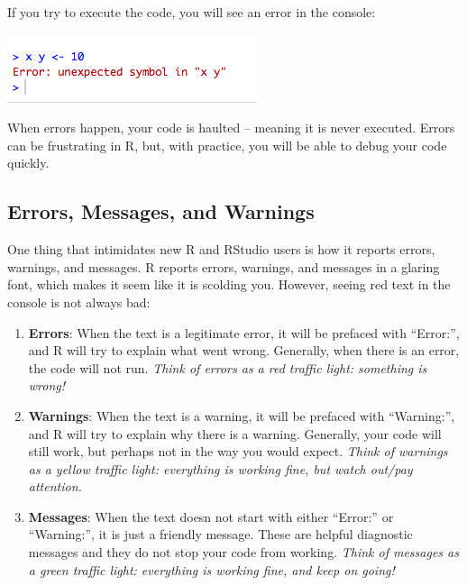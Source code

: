 \documentclass[]{book}
\begin{document}
If you try to execute the code, you will see an error in the console:

\begin{center}\includegraphics[width=0.7\linewidth]{img/error} \end{center}

When errors happen, your code is haulted -- meaning it is never
executed. Errors can be frustrating in R, but, with practice, you will
be able to debug your code quickly.

\subsection{Errors, Messages, and
Warnings}\label{errors-messages-and-warnings}

One thing that intimidates new R and RStudio users is how it reports
errors, warnings, and messages. R reports errors, warnings, and messages
in a glaring font, which makes it seem like it is scolding you. However,
seeing red text in the console is not always bad:

\begin{enumerate}
\def\labelenumi{\arabic{enumi}.}
\item
  \textbf{Errors}: When the text is a legitimate error, it will be
  prefaced with ``Error:'', and R will try to explain what went wrong.
  Generally, when there is an error, the code will not run. \emph{Think
  of errors as a red traffic light: something is wrong!}
\item
  \textbf{Warnings}: When the text is a warning, it will be prefaced
  with ``Warning:'', and R will try to explain why there is a warning.
  Generally, your code will still work, but perhaps not in the way you
  would expect. \emph{Think of warnings as a yellow traffic light:
  everything is working fine, but watch out/pay attention.}
\item
  \textbf{Messages}: When the text doesn not start with either
  ``Error:'' or ``Warning:'', it is just a friendly message. These are
  helpful diagnostic messages and they do not stop your code from
  working. \emph{Think of messages as a green traffic light: everything
  is working fine, and keep on going!}
\end{enumerate}
\end{document}
